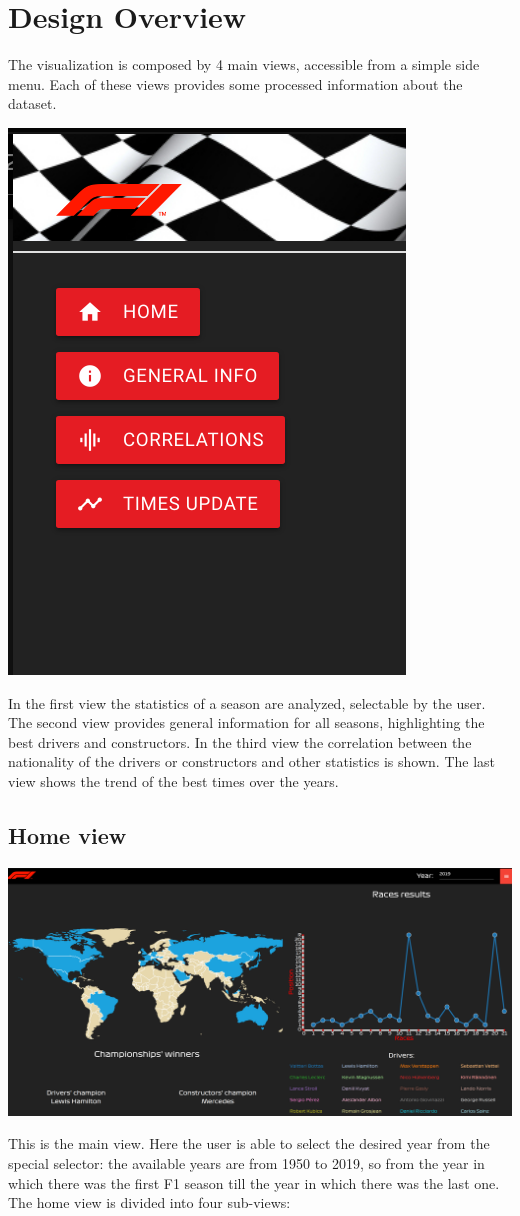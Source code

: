 \documentclass[10pt,twocolumn,letterpaper]{article}
\begin{document}
\section{Design Overview}
The visualization is composed by 4 main views, accessible from a simple side menu. Each of these views provides some processed information about the dataset.
\begin{center}
	\centering
	\includegraphics[width=0.3\columnwidth]{menu}
\end{center}
In the first view the statistics of a season are analyzed, selectable by the user. The second view provides general information for all seasons, highlighting the best drivers and constructors. In the third view the correlation between the nationality of the drivers or constructors and other statistics is shown. The last view shows the trend of the best times over the years.

\subsection{Home view}
\begin{center}
	\centering
	\includegraphics[width=\columnwidth]{home}
\end{center}

This is the main view. Here the user is able to select the desired year from the special selector: the available years are from 1950 to 2019, so from the year in which there was
the first F1 season till the year in which there was the last one. The home view is divided into four sub-views:
\end{document}
